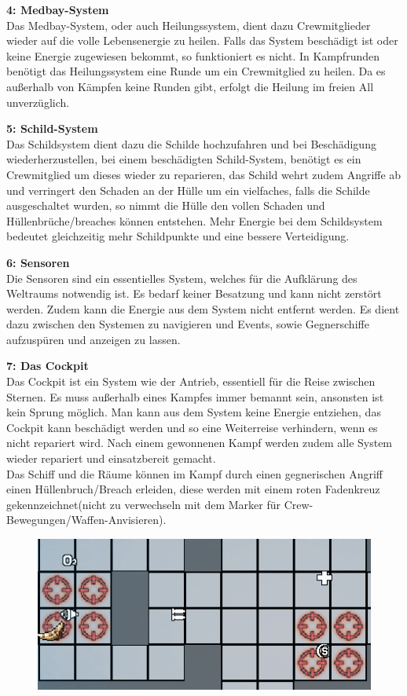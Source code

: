 \documentclass[fontsize=12pt,paper=a4,twoside]{scrartcl}
\begin{document}
\textbf{4: Medbay-System} 
\\
Das Medbay-System, oder auch Heilungssystem, dient dazu Crewmitglieder wieder auf die volle Lebensenergie zu heilen.
Falls das System beschädigt ist oder keine Energie zugewiesen bekommt, so funktioniert es nicht. In Kampfrunden benötigt das Heilungssystem eine Runde um ein Crewmitglied zu heilen. Da es außerhalb von Kämpfen keine Runden gibt, erfolgt die Heilung im freien All unverzüglich. 

\textbf{5: Schild-System}
\\
Das Schildsystem dient dazu die Schilde hochzufahren und bei Beschädigung wiederherzustellen, bei einem beschädigten Schild-System, benötigt es ein Crewmitglied um dieses wieder zu reparieren, das Schild wehrt zudem Angriffe ab und verringert den Schaden an der Hülle um ein vielfaches, falls die Schilde ausgeschaltet wurden, so nimmt die Hülle den vollen Schaden und Hüllenbrüche/breaches können entstehen. Mehr Energie bei dem Schildsystem bedeutet gleichzeitig mehr Schildpunkte und eine bessere Verteidigung.

\textbf{6: Sensoren}
\\
Die Sensoren sind ein essentielles System, welches für die Aufklärung des Weltraums notwendig ist. Es bedarf keiner Besatzung und kann nicht zerstört werden. Zudem kann die Energie aus dem System nicht entfernt werden. Es dient dazu zwischen den Systemen zu navigieren und Events, sowie Gegnerschiffe aufzuspüren und anzeigen zu lassen.

\textbf{7: Das Cockpit}
\\
Das Cockpit ist ein System wie der Antrieb, essentiell für die Reise zwischen Sternen. Es muss außerhalb eines Kampfes immer bemannt sein, ansonsten ist kein Sprung möglich. Man kann aus dem System keine Energie entziehen, das Cockpit kann beschädigt werden und so eine Weiterreise verhindern, wenn es nicht repariert wird. Nach einem gewonnenen Kampf werden zudem alle System wieder repariert und einsatzbereit gemacht.
\\
Das Schiff und die Räume können im Kampf durch einen gegnerischen Angriff einen Hüllenbruch/Breach erleiden, diese werden mit einem roten Fadenkreuz gekennzeichnet(nicht zu verwechseln mit dem Marker für Crew-Bewegungen/Waffen-Anvisieren).

\begin{figure}[H]
\centering
\includegraphics[width=0.7\linewidth]{DasSpiel/Ui/breach.png}
\end{figure}
\end{document}

